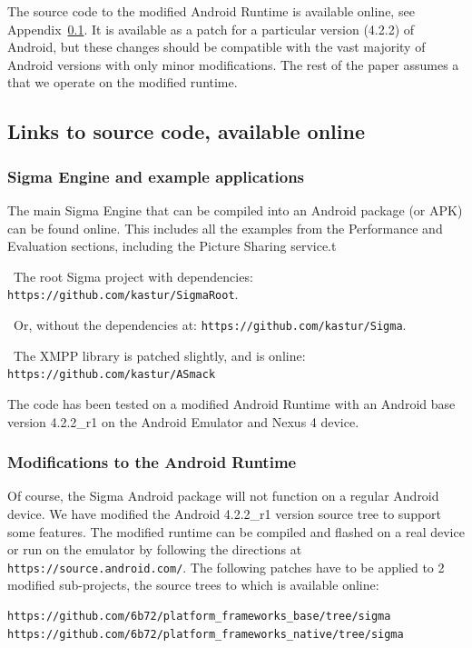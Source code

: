 \documentclass[prodmode]{acmlarge}
\begin{document}
The source code to the modified Android Runtime is available online, see Appendix~\ref{app:SourceCode}. It is available as a patch for a particular version (4.2.2) of Android, but these changes should be compatible with the vast majority of Android versions with only minor modifications. The rest of the paper assumes a that we operate on the modified runtime.

\subsection{Links to source code, available online}
\label{app:SourceCode}

\subsubsection{Sigma Engine and example applications}
The main Sigma Engine that can be compiled into an Android package (or APK) can be found online. This includes all the examples from the Performance and Evaluation sections, including the Picture Sharing service.t

\noindent~The root Sigma project with dependencies: \verb|https://github.com/kastur/SigmaRoot|.

\noindent~Or, without the dependencies at: \verb|https://github.com/kastur/Sigma|.

\noindent~The XMPP library is patched slightly, and is online: \verb|https://github.com/kastur/ASmack|

The code has been tested on a modified Android Runtime with an Android base version 4.2.2\_r1 on the Android Emulator and Nexus 4 device.

\subsubsection{Modifications to the Android Runtime}
Of course, the Sigma Android package will not function on a regular Android device. We have modified the Android 4.2.2\_r1 version source tree to support some features. The modified runtime can be compiled and flashed on a real device or run on the emulator by following the directions at \verb|https://source.android.com/|. The following patches have to be applied to 2 modified sub-projects, the source trees to which is available online:

\begin{Verbatim}
https://github.com/6b72/platform_frameworks_base/tree/sigma
https://github.com/6b72/platform_frameworks_native/tree/sigma
\end{Verbatim}
\end{document}
